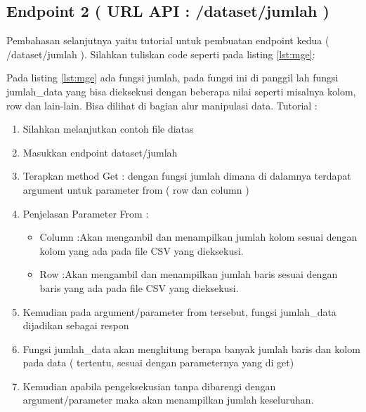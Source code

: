 \subsection{Endpoint 2 ( URL API : /dataset/jumlah )}
Pembahasan selanjutnya yaitu tutorial untuk pembuatan endpoint kedua ( /dataset/jumlah ). Silahkan tuliskan code seperti pada listing \ref{lst:mge}:

Pada listing \ref{lst:mge} ada fungsi jumlah, pada fungsi ini di panggil lah fungsi jumlah\_data yang bisa dieksekusi dengan beberapa nilai seperti misalnya kolom, row dan lain-lain. Bisa dilihat di bagian alur manipulasi data. 
Tutorial :
\begin{enumerate}
\item Silahkan melanjutkan contoh file diatas
\item Masukkan endpoint dataset/jumlah
\item Terapkan method Get : dengan fungsi jumlah dimana di dalamnya terdapat argument untuk parameter from ( row dan column )
\item Penjelasan Parameter From :
\begin{itemize}
\item Column		:Akan mengambil dan menampilkan jumlah kolom sesuai dengan kolom yang ada pada file CSV yang dieksekusi.
\item Row		:Akan mengambil dan menampilkan jumlah baris sesuai dengan baris yang ada pada file CSV yang dieksekusi.
\end{itemize}
\item Kemudian pada argument/parameter from tersebut, fungsi jumlah\_data dijadikan sebagai respon
\item Fungsi jumlah\_data akan menghitung berapa banyak jumlah baris dan kolom pada data ( tertentu, sesuai dengan parameternya yang di get)
\item Kemudian apabila pengeksekusian tanpa dibarengi dengan argument/parameter maka akan menampilkan jumlah keseluruhan.
\end{enumerate}

